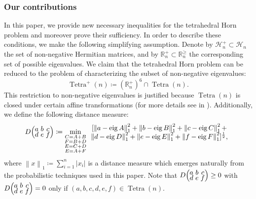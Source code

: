 \documentclass[notitlepage, 11pt, letterpaper]{amsart}
\theoremstyle{plain}
\theoremstyle{definition}
\let\cref\crtcref
\DeclareMathOperator{\Tetra}{Tetra}
\DeclareMathOperator{\eig}{eig}
\newcommand{\norm}[1]{\left\lVert#1\right\rVert}
\newcommand{\abs}[1]{\left|#1\right|}
\newcommand{\herm}[1]{\mathcal H_{#1}}
\newcommand{\hermp}[1]{\mathcal H^{+}_{#1}}
\newcommand{\eigs}[1]{\mathbb R^{\geq}_{#1}}
\newcommand{\eigsp}[1]{\mathbb R^{+}_{#1}}
\newcommand{\ea}{a}
\newcommand{\eb}{b}
\newcommand{\ec}{c}
\newcommand{\ed}{d}
\newcommand{\ee}{e}
\newcommand{\ef}{f}
\newcommand{\tightparensixj}[1]{
\begingroup
\arraycolsep=1.5pt
\renewcommand{\arraystretch}{0.3}
\left(\!\begin{array}{ccc}
    #1
\end{array}\!\right)
\endgroup
}
\begin{document}
\subsubsection*{Our contributions}
In this paper, we provide new necessary inequalities for the tetrahedral Horn problem and moreover prove their sufficiency.
In order to describe these conditions, we make the following simplifying assumption.
Denote by $\hermp{n} \subset \herm{n}$ the set of non-negative Hermitian matrices, and by $\eigsp{n} \subset \eigs{n}$ the corresponding set of possible eigenvalues.
We claim that the tetrahedral Horn problem can be reduced to the problem of characterizing the subset of non-negative eigenvalues:
\begin{equation}
    \Tetra^+(n) \coloneqq (\eigsp{n})^6 \cap \Tetra(n).
\end{equation}
This restriction to non-negative eigenvalues is justified because $\Tetra(n)$ is closed under certain affine transformations (for more details see \cref{cor:psd} in \cref{sec:symmetries}).
Additionally, we define the following distance measure:
\begin{equation}
    D\!\tightparensixj{\ea & \eb & \ec \\ \ed & \ee & \ef} \coloneqq
    \min_{\substack{C=A+B \\ F=B+D \\ E = C+D \\ E = A+F}}
    \begin{array}{c}
        [
        \norm{ \ea - \eig A }_{1}^2 + \norm{ \eb - \eig B }_{1}^2 + \norm{ \ec - \eig C }_{1}^2 + \\
        \norm{ \ed - \eig D }_{1}^2 + \norm{ \ee - \eig E }_{1}^2 + \norm{ \ef - \eig F }_{1}^2
        ]^{\frac{1}{2}},
    \end{array}
\end{equation}
where $\norm{x}_{1} \coloneqq \sum_{i=1}^{n} \abs{x_i}$ is a distance measure which emerges naturally from the probabilistic techniques used in this paper.
Note that $D\!\tightparensixj{\ea & \eb & \ec \\ \ed & \ee & \ef} \geq 0$ with $D\!\tightparensixj{\ea & \eb & \ec \\ \ed & \ee & \ef} = 0$ only if $(\ea, \eb, \ec, \ed, \ee, \ef) \in \Tetra(n)$.
\end{document}
